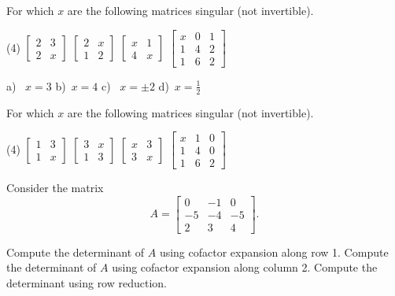\begin{exercise}
For which $x$ are the following matrices singular (not invertible).
\begin{tasks}(4)
\task
$\begin{bmatrix}
2 & 3 \\
2 & x
\end{bmatrix}$
\task
$\begin{bmatrix}
2 & x \\
1 & 2
\end{bmatrix}$
\task
$\begin{bmatrix}
x & 1 \\
4 & x
\end{bmatrix}$
\task
$\begin{bmatrix}
x & 0 & 1 \\
1 & 4 & 2 \\
1 & 6 & 2
\end{bmatrix}$
\end{tasks}
\end{exercise}
\comboSol{%
}
{%
a)~ $x=3$ \quad b)~$x=4$ \quad c)~ $x=\pm2$ \quad d)~$x = \frac{1}{2}$
}

\begin{exercise}\ansMark%
For which $x$ are the following matrices singular (not invertible).
\begin{tasks}(4)
\task
$\begin{bmatrix}
1 & 3 \\
1 & x
\end{bmatrix}$
\task
$\begin{bmatrix}
3 & x \\
1 & 3
\end{bmatrix}$
\task
$\begin{bmatrix}
x & 3 \\
3 & x
\end{bmatrix}$
\task
$\begin{bmatrix}
x & 1 & 0 \\
1 & 4 & 0 \\
1 & 6 & 2
\end{bmatrix}$
\end{tasks}
\end{exercise}

\begin{exercise}\ansMark%
Consider the matrix
\begin{equation*}
A = \begin{bmatrix}
0 & -1 & 0 \\ -5 & -4 & -5 \\ 2 & 3 & 4
\end{bmatrix}.
\end{equation*}
\begin{tasks}
\task Compute the determinant of $A$ using cofactor expansion along row 1.
\task Compute the determinant of $A$ using cofactor expansion along column 2.
\task Compute the determinant using row reduction.
\end{tasks}
\end{exercise}
%


